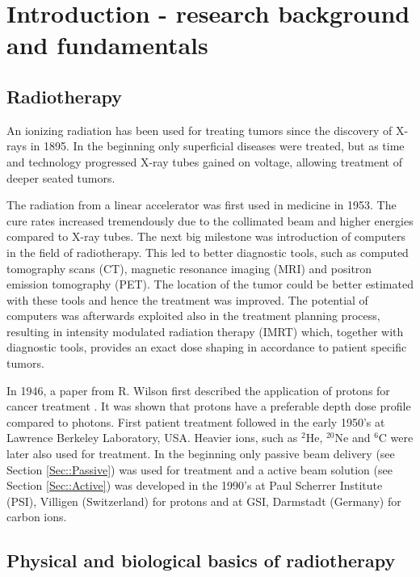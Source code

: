 \chapter{Introduction - research background and fundamentals}
\label{chapter:intro}
\minitoc

\section{Radiotherapy}

An ionizing radiation has been used for treating tumors since the discovery of X-rays in 1895. In the beginning only superficial diseases were treated, but as time and technology progressed X-ray tubes gained on voltage, allowing treatment of deeper seated tumors.

The radiation from a linear accelerator was first used in medicine in 1953. The cure rates increased tremendously due to the collimated beam and higher energies compared to X-ray tubes. The next big milestone was introduction of computers in the field
of radiotherapy. This led to better diagnostic tools, such as computed tomography scans (CT), magnetic resonance imaging (MRI) and
positron emission tomography (PET). The location of the tumor could be better estimated with these tools and hence the treatment was improved. The potential of computers was afterwards exploited also in the treatment planning process, resulting in intensity modulated
radiation therapy (IMRT) which, together with diagnostic tools, provides an exact dose shaping in accordance to patient specific tumors.

In 1946, a paper from R. Wilson first described the application of protons for cancer treatment \cite{Wilson1946}. It was shown that protons have a preferable depth dose profile compared to photons. First patient treatment followed in the early 1950's at Lawrence Berkeley Laboratory, USA. Heavier ions, such as 
$^{2}$He, $^{20}$Ne and $^6$C were later also used for treatment. In the beginning only passive beam delivery (see Section \ref{Sec::Passive}) was used for treatment and a active beam solution (see Section \ref{Sec::Active}) was developed in the 1990's at Paul Scherrer Institute (PSI), Villigen (Switzerland) for protons and at GSI, Darmstadt (Germany) for carbon ions.


\section{Physical and biological basics of radiotherapy}

